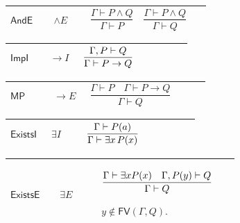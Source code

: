 \documentclass[12pt,reqno]{amsart}
\theoremstyle{blueplain}
\numberwithin{equation}{section}
\begin{document}
{\scriptsize \setlength{\parskip}{0pt}\nointerlineskip
\noindent 
\begin{tabular}{|@{}>{\centering\arraybackslash}m{0.19251\linewidth}|>{\centering\arraybackslash}m{0.16845\linewidth}|>{\centering\arraybackslash}m{0.53904\linewidth}|}
\hline
\hypertarget{rule:AndE}{$\displaystyle \mathsf{AndE}$} & $\displaystyle %
\wedge E$ & \rule[-3.3ex]{0pt}{7.8ex}$\displaystyle \dfrac{\Gamma\vdash
P\land Q}{\Gamma\vdash P}\quad\dfrac{\Gamma\vdash P\land Q}{\Gamma\vdash Q}$
\\ \hline
\end{tabular}%
}

{\scriptsize \setlength{\parskip}{0pt}\nointerlineskip
\noindent 
\begin{tabular}{|@{}>{\centering\arraybackslash}m{0.19251\linewidth}|>{\centering\arraybackslash}m{0.16845\linewidth}|>{\centering\arraybackslash}m{0.53904\linewidth}|}
\hline
\hypertarget{rule:ImpI}{$\displaystyle \mathsf{ImpI}$} & $\displaystyle \to
I $ & \rule[-3.3ex]{0pt}{7.8ex}$\displaystyle \dfrac{\Gamma,P\vdash Q}{%
\Gamma\vdash P\to Q}$ \\ \hline
\end{tabular}%
}

{\scriptsize \setlength{\parskip}{0pt}\nointerlineskip
\noindent 
\begin{tabular}{|@{}>{\centering\arraybackslash}m{0.19251\linewidth}|>{\centering\arraybackslash}m{0.16845\linewidth}|>{\centering\arraybackslash}m{0.53904\linewidth}|}
\hline
\hypertarget{rule:MP}{$\displaystyle \mathsf{MP}$} & $\displaystyle \to E$ & 
\rule[-3.3ex]{0pt}{7.8ex}$\displaystyle \dfrac{\Gamma\vdash
P\quad\Gamma\vdash P\to Q}{\Gamma\vdash Q}$ \\ \hline
\end{tabular}%
}

{\scriptsize \setlength{\parskip}{0pt}\nointerlineskip
\noindent 
\begin{tabular}{|@{}>{\centering\arraybackslash}m{0.19251\linewidth}|>{\centering\arraybackslash}m{0.16845\linewidth}|>{\centering\arraybackslash}m{0.53904\linewidth}|}
\hline
\hypertarget{rule:ExistsI}{$\displaystyle \mathsf{ExistsI}$} & $%
\displaystyle \exists I$ & \rule[-3.3ex]{0pt}{7.8ex}$\displaystyle \dfrac{%
\Gamma\vdash P(a)}{\Gamma\vdash\exists x\,P(x)}$ \\ \hline
\end{tabular}%
}

{\scriptsize \setlength{\parskip}{0pt}\nointerlineskip
\noindent 
\begin{tabular}{|@{}>{\centering\arraybackslash}m{0.19251\linewidth}|>{\centering\arraybackslash}m{0.16845\linewidth}|>{\centering\arraybackslash}m{0.53904\linewidth}|}
\hline
\hypertarget{rule:ExistsE}{$\displaystyle \mathsf{ExistsE}$} & $%
\displaystyle \exists E$ & \rule[-3.3ex]{0pt}{7.8ex}$\displaystyle \dfrac{%
\Gamma\vdash\exists xP(x)\quad\Gamma,P(y)\vdash Q}{\Gamma\vdash Q}$\par$%
\displaystyle y\notin\mathsf{FV}(\Gamma,Q).$ \\ \hline
\end{tabular}%
}
\end{document}
